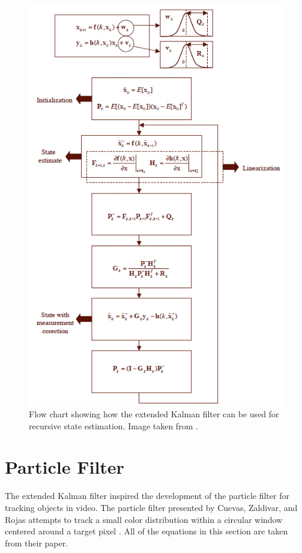 \documentclass[11pt]{article}
\begin{document}
\begin{figure}[H]
\centering
\includegraphics[scale=.6]{img/ekfstateestimation.jpg}
\caption{Flow chart showing how the extended Kalman filter can be used for recursive state estimation. Image taken from \cite{kalman}.}
\label{fig:ekfstateestimation}
\end{figure}



\section{Particle Filter}
\label{sec:particlefilter}

The extended Kalman filter inspired the development of the particle filter for tracking objects in video. The particle filter presented by Cuevas,  Zaldivar, and Rojas attempts to track a small color distribution within a circular window centered around a target pixel \cite{particle}. All of the equations in this section are taken from their paper. 
\end{document}
